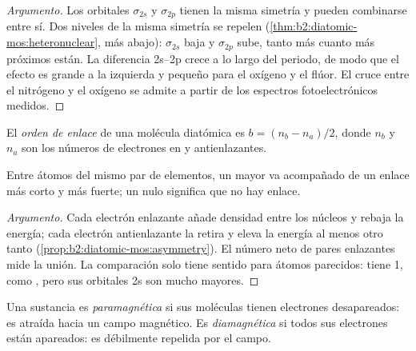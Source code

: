 \begin{proof}[Argumento]
Los orbitales $\sigma_{2s}$ y $\sigma_{2p}$ tienen la misma simetría y pueden combinarse
entre sí. Dos niveles de la misma simetría se repelen (\cref{thm:b2:diatomic-mos:heteronuclear},
más abajo): $\sigma_{2s}$ baja y $\sigma_{2p}$ sube, tanto más cuanto más próximos están. La
diferencia 2s--2p crece a lo largo del periodo, de modo que el efecto es grande a la izquierda y pequeño para
el oxígeno y el flúor. El cruce entre el nitrógeno y el oxígeno se admite a partir de los
espectros fotoelectrónicos medidos.
\end{proof}

\begin{definition}\label{def:b2:diatomic-mos:bond-order}
El \emph{orden de enlace} de una molécula diatómica es $b = (n_b -
n_a)/2$, donde $n_b$ y $n_a$ son los números de electrones en  y
antienlazantes.
\end{definition}

\begin{proposition}\label{prop:b2:diatomic-mos:bond-order}
Entre átomos del mismo par de elementos, un  mayor va acompañado de un
enlace más corto y más fuerte; un  nulo significa que no hay enlace.
\end{proposition}

\begin{proof}[Argumento]
Cada electrón enlazante añade densidad entre los núcleos y rebaja la energía;
cada electrón antienlazante la retira y eleva la energía al menos otro tanto
(\cref{prop:b2:diatomic-mos:asymmetry}). El número neto de pares enlazantes mide
la unión. La comparación solo tiene sentido para átomos parecidos:  tiene
 1, como , pero sus orbitales 2s son mucho mayores.
\end{proof}

\begin{definition}\label{def:b2:diatomic-mos:magnetism}
Una sustancia es \emph{paramagnética} si sus moléculas tienen
electrones desapareados: es atraída hacia un campo magnético. Es
\emph{diamagnética} si todos sus electrones están apareados: es
débilmente repelida por el campo.
\end{definition}

